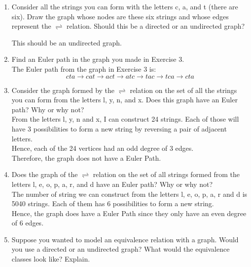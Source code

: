 \documentclass[12pt]{article}
\begin{document}
\begin{enumerate}
  \item Consider all the strings you can form with the letters c, a, and t (there are six). Draw the graph whose nodes are these six strings and whose edges represent the $\rightleftharpoons$ relation. Should this be a directed or an undirected graph?
  \begin{center}
  \end{center}
  This should be an undirected graph.
  \item Find an Euler path in the graph you made in Exercise 3.\\
  The Euler path from the graph in Exercise 3 is: 
  \[cta \rightarrow cat \rightarrow act \rightarrow atc \rightarrow tac \rightarrow tca \rightarrow cta\]
  \item Consider the graph formed by the $\rightleftharpoons$ relation on the set of all the strings you can form from the letters l, y, n, and x. Does this graph have an Euler path? Why or why not?\\
  From the letters l, y, n and x, I can construct 24 strings. Each of those will have 3 possibilities to form a new string by reversing a pair of adjacent letters. \\
  Hence, each of the 24 vertices had an odd degree of 3 edges.\\
  Therefore, the graph does not have a Euler Path.
  \item Does the graph of the $\rightleftharpoons$ relation on the set of all strings formed from the letters l, e, o, p, a, r, and d have an Euler path? Why or why not?\\
  The number of string we can construct from the letters l, e, o, p, a, r and d is 5040 strings. Each of them has 6 possibilities to form a new string.\\
  Hence, the graph does have a Euler Path since they only have an even degree of 6 edges.
  \item Suppose you wanted to model an equivalence relation with a graph. Would you use a directed or an undirected graph? What would the equivalence classes look like? Explain.
  
\end{enumerate}
\end{document}
